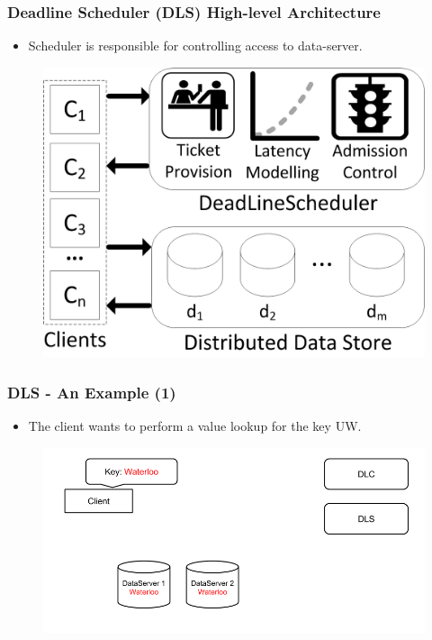 \documentclass{beamer}
\begin{document}
\begin{frame}
  \frametitle{Deadline Scheduler (DLS) High-level Architecture}
  \begin{itemize}
  \item Scheduler is responsible for controlling access to
    data-server.
  \end{itemize}
  \begin{figure}
    \begin{center}
      \centerline{\includegraphics[scale=0.90]{img/DLS.png}}
    \end{center}
  \end{figure}
\end{frame}

\begin{frame}
  \frametitle{DLS - An Example (1)}
  \begin{itemize}
  \item The client wants to perform a value lookup for the key UW.
    \newline
  \end{itemize}
  \begin{figure}
    \begin{center}
      \centerline{\includegraphics[scale=0.40]{img/DLS_Example01.png}}
    \end{center}
  \end{figure}
\end{frame}
\end{document}
